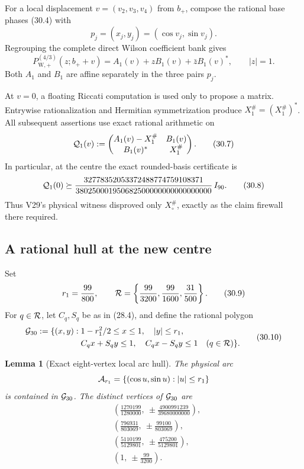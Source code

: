 \documentclass[11pt,oneside]{article}
\newtheorem{lemma}[theorem]{Lemma}
\theoremstyle{definition}
\theoremstyle{remark}
\begin{document}
For a local displacement \(v=(v_2,v_3,v_4)\) from \(b_+\), compose
the rational base phases (30.4) with
\[
 p_j=(x_j,y_j)=(\cos v_j,\sin v_j).                    \tag{30.5}
\]
Regrouping the complete direct Wilson coefficient bank gives
\[
 P_{\mathrm W,+}^{(4/3)}(z;b_++v)
 =A_1(v)+zB_1(v)+\bar zB_1(v)^*,\qquad |z|=1.          \tag{30.6}
\]
Both \(A_1\) and \(B_1\) are affine separately in the three pairs
\(p_j\).

At \(v=0\), a floating Riccati computation is used only to propose a
matrix.  Entrywise rationalization and Hermitian symmetrization
produce \(X_1^\#=(X_1^\#)^*\).  All subsequent assertions use exact
rational arithmetic on
\[
 {\cal Q}_1(v):=
 \begin{pmatrix}
 A_1(v)-X_1^\#&B_1(v)\\
 B_1(v)^*&X_1^\#
 \end{pmatrix}.                                        \tag{30.7}
\]
In particular, at the centre the exact rounded-basis certificate is
\[
 {\cal Q}_1(0)\succeq
 \frac{32778352053372488774759108371}
 {380250001950682500000000000000000}\,I_{90}.          \tag{30.8}
\]
Thus V29's physical witness disproved only \(X_\circ^\#\), exactly as
the claim firewall there required.

\subsection{A rational hull at the new centre}

Set
\[
 r_1=\frac{99}{800},\qquad
 {\cal R}=\left\{\frac{99}{3200},\frac{99}{1600},
                         \frac{31}{500}\right\}.        \tag{30.9}
\]
For \(q\in{\cal R}\), let \(C_q,S_q\) be as in (28.4), and define
the rational polygon
\[
\begin{split}
 {\cal G}_{30}:=\{(x,y):\;&1-r_1^2/2\le x\le1,\quad
                  |y|\le r_1,\\
                &C_qx+S_qy\le1,\quad
                  C_qx-S_qy\le1\quad(q\in{\cal R})\}.
\end{split}                                                    \tag{30.10}
\]

\begin{lemma}[Exact eight-vertex local arc hull]
\label{lem:newv30-arc-hull}
The physical arc
\[
 {\cal A}_{r_1}=\{(\cos u,\sin u):|u|\le r_1\}
\]
is contained in \({\cal G}_{30}\).  The distinct vertices of
\({\cal G}_{30}\) are
\[
\begin{split}
 &\left(\frac{1270199}{1280000},
          \ \pm\frac{4900991239}{39680000000}\right),\\
 &\left(\frac{796931}{803069},
          \ \pm\frac{99100}{803069}\right),\\
 &\left(\frac{5110199}{5129801},
          \ \pm\frac{475200}{5129801}\right),\\
 &\left(1,\ \pm\frac{99}{3200}\right).
\end{split}                                                    \tag{30.11}
\]
\end{lemma}
\end{document}
